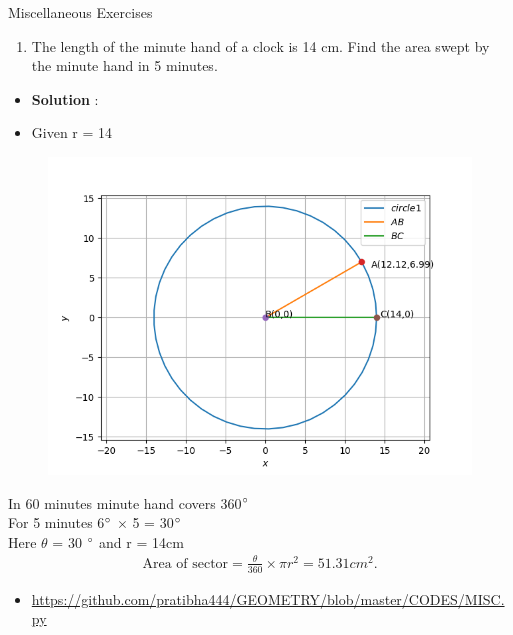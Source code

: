 \begin{frame}{Miscellaneous Exercises}
\begin{enumerate}
\conti
\item The length of the
minute hand of a clock is 14 cm. Find the area
swept by the minute hand in 5 minutes.\\
\seti
\end{enumerate}
\begin{itemize}
\item \textbf{Solution} :
\item Given r = 14 
\begin{figure}[!ht]
\resizebox{0.5\linewidth}{!}
{

}

\end{figure}


\end{itemize}
\end{frame}
\begin{frame}
\begin{figure}
\includegraphics[scale=.6]{./CODES/MISC.png}
\end{figure}
\end{frame}
\begin{frame}

 In 60 minutes minute hand covers  360$\degree$\\
For 5 minutes 6$\degree$ $\times$ 5 = 30$\degree$\\ 
Here $\theta$ = 30 $\degree$ and r = 14cm\\

\begin{align*}
	\text{Area of sector} = \frac{\theta}{360} \times \pi r^2
	=51.31cm^2.
\end{align*}   
\begin{itemize}
\item \url {https://github.com/pratibha444/GEOMETRY/blob/master/CODES/MISC.py} 
\end{itemize}             
\end{frame}
